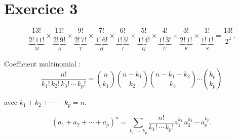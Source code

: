 \part{Exercice 3}

\[
	\underbrace{\frac{13!}{2!\,11!}}_M \times
	\underbrace{\frac{11!}{2!\,9!}}_A \times
	\underbrace{\frac{9!}{2!\,7!}}_T \times
	\underbrace{\frac{7!}{1!\,6!}}_H \times
	\underbrace{\frac{6!}{1!\,5!}}_I \times
	\underbrace{\frac{5!}{1!\,4!}}_Q \times
	\underbrace{\frac{4!}{1!\,3!}}_U \times
	\underbrace{\frac{3!}{2!\,1!}}_E \times
	\underbrace{\frac{1!}{1!\,1!}}_S = \frac{13!}{2^4}.
\]

Coefficient multinomial : \[
	\frac{n!}{k_1!\,k_2!\,k_3!\,\cdots\,k_p!} = {n \choose k_1} {n-k_1\choose k_2} {n - k_1 - k_2 \choose k_3} \cdots {k_p\choose k_p}
\]

avec $k_1 + k_2 + \cdots + k_p = n$.

\[
	(a_1 + a_2 + \cdots + a_p)^n = \sum_{k_1, \cdots, k_p} \frac{n!}{k_1!\,\cdots\,k_p!} a_1^{k_1}\,a_2^{k_2}\,\cdots\,a_p^{k_p}.
\]
